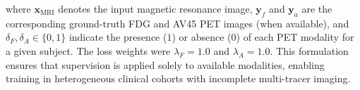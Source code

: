 where $\mathbf{x}_{\text{MRI}}$ denotes the input magnetic resonance image, $\mathbf{y}_f$ and $\mathbf{y}_a$ are the corresponding ground-truth FDG and AV45 PET images (when available), and $\delta_F, \delta_A \in \{0,1\}$ indicate the presence ($1$) or absence ($0$) of each PET modality for a given subject. The loss weights were $\lambda_F=1.0$ and $\lambda_A=1.0$. This formulation ensures that supervision is applied solely to available modalities, enabling training in heterogeneous clinical cohorts with incomplete multi-tracer imaging.
